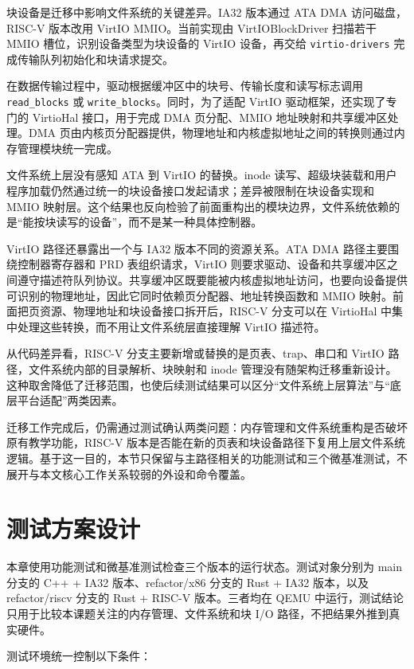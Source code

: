块设备是迁移中影响文件系统的关键差异。IA32 版本通过 ATA DMA 访问磁盘，RISC-V 版本改用 VirtIO MMIO。当前实现由 VirtIOBlockDriver 扫描若干 MMIO 槽位，识别设备类型为块设备的 VirtIO 设备，再交给 \texttt{virtio-drivers} 完成传输队列初始化和块请求提交。

在数据传输过程中，驱动根据缓冲区中的块号、传输长度和读写标志调用 \texttt{read\_blocks} 或 \texttt{write\_blocks}。同时，为了适配 VirtIO 驱动框架，还实现了专门的 VirtioHal 接口，用于完成 DMA 页分配、MMIO 地址映射和共享缓冲区处理。DMA 页由内核页分配器提供，物理地址和内核虚拟地址之间的转换则通过内存管理模块统一完成。

文件系统上层没有感知 ATA 到 VirtIO 的替换。inode 读写、超级块装载和用户程序加载仍然通过统一的块设备接口发起请求；差异被限制在块设备实现和 MMIO 映射层。这个结果也反向检验了前面重构出的模块边界，文件系统依赖的是“能按块读写的设备”，而不是某一种具体控制器。

VirtIO 路径还暴露出一个与 IA32 版本不同的资源关系。ATA DMA 路径主要围绕控制器寄存器和 PRD 表组织请求，VirtIO 则要求驱动、设备和共享缓冲区之间遵守描述符队列协议。共享缓冲区既要能被内核虚拟地址访问，也要向设备提供可识别的物理地址，因此它同时依赖页分配器、地址转换函数和 MMIO 映射。前面把页资源、物理地址和块设备接口拆开后，RISC-V 分支可以在 VirtioHal 中集中处理这些转换，而不用让文件系统层直接理解 VirtIO 描述符。

从代码差异看，RISC-V 分支主要新增或替换的是页表、trap、串口和 VirtIO 路径，文件系统内部的目录解析、块映射和 inode 管理没有随架构迁移重新设计。这种取舍降低了迁移范围，也使后续测试结果可以区分“文件系统上层算法”与“底层平台适配”两类因素。

\par
迁移工作完成后，仍需通过测试确认两类问题：内存管理和文件系统重构是否破坏原有教学功能，RISC-V 版本是否能在新的页表和块设备路径下复用上层文件系统逻辑。基于这一目的，本节只保留与主路径相关的功能测试和三个微基准测试，不展开与本文核心工作关系较弱的外设和命令覆盖。

\section{测试方案设计}

本章使用功能测试和微基准测试检查三个版本的运行状态。测试对象分别为 main 分支的 C++ + IA32 版本、refactor/x86 分支的 Rust + IA32 版本，以及 refactor/riscv 分支的 Rust + RISC-V 版本。三者均在 QEMU 中运行，测试结论只用于比较本课题关注的内存管理、文件系统和块 I/O 路径，不把结果外推到真实硬件。

测试环境统一控制以下条件：

